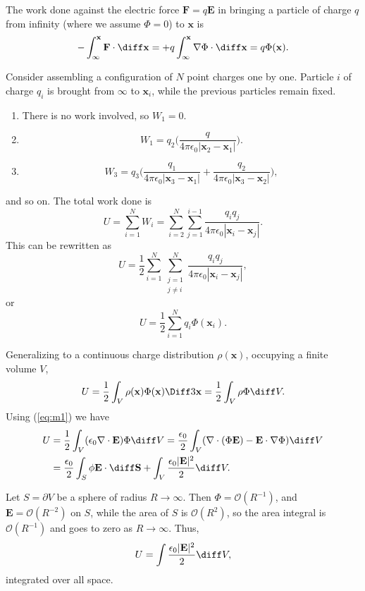 \documentclass[12pt]{article}
\begin{document}
The work done against the electric force $\mathbf{F} = q \mathbf{E}$ in bringing a particle of charge $q$ from infinity (where we assume $\Phi = 0$) to $\mathbf{x}$ is
\[
- \int_{\infty}^{\mathbf{x}} \mathbf{F} \cdot \diff \mathbf{x} = +q \int_{\infty}^{\mathbf{x}} \nabla \Phi \cdot \diff \mathbf{x} = q \Phi (\mathbf{x})
.\]

Consider assembling a configuration of $N$ point charges one by one. Particle $i$ of charge $q_i$ is brought from $\infty$ to $\mathbf{x}_i$, while the previous particles remain fixed.
\begin{enumerate}[label = Particle \arabic*.]
	\item There is no work involved, so $W_1 = 0$.
	\item
		\[
		W_1 = q_2 \biggl( \frac{q}{4 \pi \epsilon_0 |\mathbf{x}_2 - \mathbf{x}_1|} \biggr)
		.\]
	\item
		\[
		W_3 = q_3 \biggl( \frac{q_1}{4 \pi \epsilon_0 |\mathbf{x}_3 - \mathbf{x}_1|} + \frac{q_2}{4 \pi \epsilon_0|\mathbf{x}_3 - \mathbf{x}_2|} \biggr)
		,\]
\end{enumerate}
and so on. The total work done is
\[
U = \sum_{i = 1}^{N} W_i = \sum_{i = 2}^{N} \sum_{j = 1}^{i-1} \frac{q_i q_j}{4 \pi \epsilon_0 |\mathbf{x}_i - \mathbf{x}_j|}
.\] 
This can be rewritten as
\[
	U = \frac{1}{2} \sum_{i = 1}^{N}\sum_{\substack{j=1\\j\neq i}}^{N} \frac{q_i q_j}{4 \pi \epsilon_0|\mathbf{x}_i - \mathbf{x}_j|}
,\]
or
\[
U = \frac{1}{2} \sum_{i = 1}^{N} q_i \Phi(\mathbf{x}_i)
.\]

Generalizing to a continuous charge distribution $\rho(\mathbf{x})$, occupying a finite volume $V$,
\[
U = \frac{1}{2} \int_{V} \rho(\mathbf{x}) \Phi(\mathbf{x}) \Diff3 \mathbf{x} = \frac{1}{2} \int_{V} \rho \Phi \diff V
.\]
Using (\ref{eq:m1}) we have
\begin{align*}
	U &= \frac{1}{2} \int_{V} (\epsilon_0 \nabla \cdot \mathbf{E}) \Phi \diff V = \frac{\epsilon_0}{2} \int_{V} (\nabla \cdot (\Phi \mathbf{E}) - \mathbf{E} \cdot \nabla \Phi) \diff V \\
	  &= \frac{\epsilon_0}{2} \int_{S} \phi \mathbf{E} \cdot \diff \mathbf{S} + \int_{V} \frac{\epsilon_0|\mathbf{E}|^2}{2} \diff V
.\end{align*}

Let $S = \partial V$ be a sphere of radius $R \to \infty$. Then $\Phi = \mathcal{O}(R^{-1})$, and $\mathbf{E} = \mathcal{O}(R^{-2})$ on $S$, while the area of $S$ is $\mathcal{O}(R^2)$, so the area integral is $\mathcal{O}(R^{-1})$ and goes to zero as $R \to \infty$. Thus,
\[
U = \int \frac{\epsilon_0 |\mathbf{E}|^2}{2} \diff V
,\]
integrated over all space.
\end{document}
